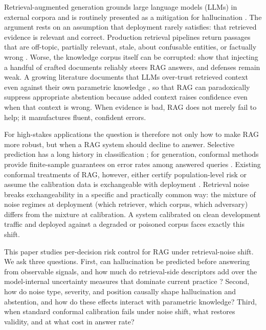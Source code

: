 \documentclass[11pt]{article}
\begin{document}
Retrieval-augmented generation \citep{lewis2020rag,gao2023ragsurvey}
grounds large language models (LLMs) in external corpora and is
routinely presented as a mitigation for hallucination
\citep{huang2023hallucinationsurvey,zhang2025ragmitigation}. The
argument rests on an assumption that deployment rarely satisfies:
that retrieved evidence is relevant and correct. Production retrieval
pipelines return passages that are off-topic, partially relevant,
stale, about confusable entities, or factually wrong
\citep{chen2023rgb,wang2024astuterag,cuconasu2024power}. Worse, the
knowledge corpus itself can be corrupted: \citet{zou2025poisonedrag}
show that injecting a handful of crafted documents reliably steers RAG
answers, and defenses remain weak. A growing literature documents that
LLMs over-trust retrieved context even against their own parametric
knowledge \citep{xie2024adaptive,kortukov2024conflicts,xu2024survey}, so that RAG
can paradoxically suppress appropriate abstention because added context
raises confidence even when that context is wrong.
When evidence is bad, RAG does not merely fail to help; it manufactures
fluent, confident errors.

For high-stakes applications the question is therefore not only how to
make RAG more robust, but when a RAG system should decline to answer.
Selective prediction has a long history in classification
\citep{chow1970,geifman2017selective}; for generation, conformal
methods provide finite-sample guarantees on error rates among answered
queries \citep{angelopoulos2024crc,abbasi2024conformalabstention,
quach2024conformal,mohri2024factuality}. Existing conformal treatments
of RAG, however, either certify population-level risk
\citep{kang2024crag} or assume the calibration data is exchangeable
with deployment \citep{li2024traq,feng2025conformalrag}. Retrieval
noise breaks exchangeability in a specific and practically common way:
the mixture of noise regimes at deployment (which retriever, which
corpus, which adversary) differs from the mixture at calibration. A
system calibrated on clean development traffic and deployed against a
degraded or poisoned corpus faces exactly this shift.

This paper studies per-decision risk control for RAG under
retrieval-noise shift. We ask three questions. First, can hallucination
be predicted before answering from observable signals, and how much do
retrieval-side descriptors add over the model-internal uncertainty
measures that dominate current practice
\citep{kuhn2023semantic,farquhar2024nature,kossen2024sep}? Second, how
do noise type, severity, and position causally shape hallucination and
abstention, and how do these effects interact with parametric
knowledge? Third, when standard conformal calibration fails under noise
shift, what restores validity, and at what cost in answer rate?
\end{document}
